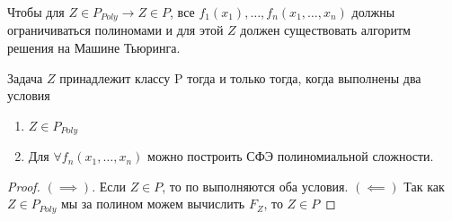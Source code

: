 \begin{proposition}
	Чтобы для $Z\in P_{Poly} \to Z \in P$, все $f_1(x_1), \ldots, f_n(x_1,
	\ldots, x_n)$ должны ограничиваться полиномами и для этой $Z$ должен
	существовать алгоритм решения на Машине Тьюринга. 
\end{proposition}


\begin{theorem}
	Задача $Z $ принадлежит классу P тогда и только тогда, когда выполнены
	два условия 
	\begin{enumerate}
		\item $Z\in P_{Poly}$ 
		\item Для $\forall f_n(x_1, \ldots, x_n)$ можно построить СФЭ
			полиномиальной сложности.
	\end{enumerate}
\end{theorem}
\begin{proof}
	$\left( \implies \right) $. Если $Z\in P$, то по 
	выполняются оба условия.
$\left( \impliedby \right) $ Так как $Z\in P_{Poly}$ мы за полином можем вычислить
	$F_Z$, то $Z\in P$
\end{proof}


